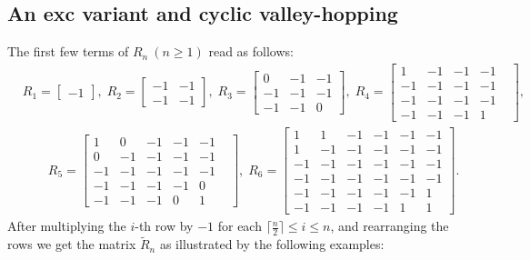 \documentclass[11pt,reqno]{amsart}
\numberwithin{equation}{section}
\theoremstyle{plain}
\theoremstyle{definition}
\begin{document}
\subsection{An exc variant and cyclic valley-hopping}
\label{tran:FS}
The first few terms of $R_n\ (n\ge1)$ read as follows:
\begin{align*}
&R_1=\begin{bmatrix}
-1
\end{bmatrix},
\;
R_2=\begin{bmatrix}
-1 & -1 \\
-1 & -1
\end{bmatrix},
\;
R_3=\begin{bmatrix}
0 & -1 & -1 \\
-1 & -1  & -1\\
-1  & -1 & 0
\end{bmatrix},
\;
R_4=\begin{bmatrix}
1 & -1 & -1 & -1 &\\
-1 & -1 & -1 & -1 \\
-1 & -1 & -1 & -1 \\
-1 & -1 & -1 & 1
\end{bmatrix},\\
&\qquad R_5=\begin{bmatrix}
1 & 0&-1 & -1 & -1 &\\
0&-1 & -1 & -1 & -1 \\
-1&-1 & -1 & -1 & -1 \\
-1&-1 & -1 & -1 & 0 \\
-1 & -1 & -1 &0 & 1
\end{bmatrix},
\;
R_6=\begin{bmatrix}
1 & 1&-1&-1 & -1 & -1 \\
1 & -1&-1&-1 & -1 & -1 \\
-1 & -1&-1&-1 & -1 & -1 \\
-1 & -1&-1&-1 & -1 & -1 \\
-1 & -1&-1&-1 & -1 & 1 \\
-1 & -1&-1&-1 & 1 & 1
\end{bmatrix}.
\end{align*}
After multiplying the $i$-th row by $-1$ for each $\lceil\frac{n}{2}\rceil\le i\le n$, and rearranging the rows we get the  matrix $\tilde R_n$ as illustrated by the following examples:
\end{document}
